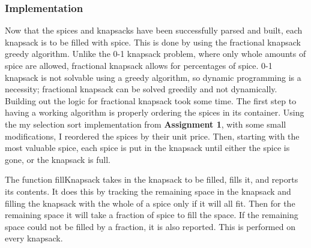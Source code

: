 \documentclass[12pt, letterpaper]{article}
\begin{document}
\subsubsection{Implementation}
Now that the spices and knapsacks have been successfully parsed and built, each knapsack is to be filled with spice.
This is done by using the fractional knapsack greedy algorithm.
Unlike the 0-1 knapsack problem, where only whole amounts of spice are allowed, fractional knapsack allows for percentages of spice.
0-1 knapsack is not solvable using a greedy algorithm, so dynamic programming is a necessity; fractional knapsack can be solved greedily and not dynamically.
\vspace*{5px}
\newline
Building out the logic for fractional knapsack took some time.
The first step to having a working algorithm is properly ordering the spices in its container.
Using the my selection sort implementation from \textbf{Assignment 1}, with some small modifications, I reordered the spices by their unit price.
Then, starting with the most valuable spice, each spice is put in the knapsack until either the spice is gone, or the knapsack is full.
\begin{center}
   
\end{center}
The function fillKnapsack takes in the knapsack to be filled, fills it, and reports its contents.
It does this by tracking the remaining space in the knapsack and filling the knapsack with the whole of a spice only if it will all fit.
Then for the remaining space it will take a fraction of spice to fill the space.
If the remaining space could not be filled by a fraction, it is also reported.
This is performed on every knapsack.
\end{document}
